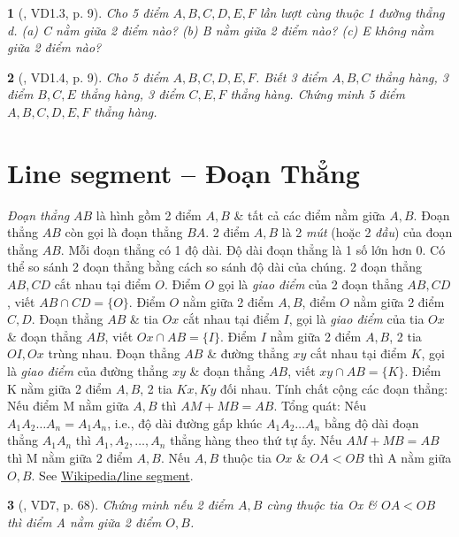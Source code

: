 \documentclass{article}
\newtheorem{baitoan}{}
\begin{document}
\begin{baitoan}[\cite{TLCT_THCS_Toan_6_hinh_hoc}, VD1.3, p. 9]
	Cho 5 điểm $A,B,C,D,E,F$ lần lượt cùng thuộc 1 đường thẳng d. (a) C nằm giữa 2 điểm nào? (b) B nằm giữa 2 điểm nào? (c) E không nằm giữa 2 điểm nào?
\end{baitoan}

\begin{baitoan}[\cite{TLCT_THCS_Toan_6_hinh_hoc}, VD1.4, p. 9]
	Cho 5 điểm $A,B,C,D,E,F$. Biết 3 điểm $A,B,C$ thẳng hàng, 3 điểm $B,C,E$ thẳng hàng, 3 điểm $C,E,F$ thẳng hàng. Chứng minh 5 điểm $A,B,C,D,E,F$ thẳng hàng.
\end{baitoan}


\section{Line segment -- Đoạn Thẳng}
 \textit{Đoạn thẳng} $AB$ là hình gồm 2 điểm $A,B$ \& tất cả các điểm nằm giữa $A,B$. Đoạn thẳng $AB$ còn gọi là đoạn thẳng $BA$. 2 điểm $A,B$ là 2 \textit{mút} (hoặc 2 \textit{đầu}) của đoạn thẳng $AB$. Mỗi đoạn thẳng có 1 độ dài. Độ dài đoạn thẳng là 1 số lớn hơn $0$.  Có thể so sánh 2 đoạn thẳng bằng cách so sánh độ dài của chúng.  2 đoạn thẳng $AB,CD$ cắt nhau tại điểm $O$. Điểm $O$ gọi là \textit{giao điểm} của 2 đoạn thẳng $AB,CD$, viết $AB\cap CD = \{O\}$. Điểm $O$ nằm giữa 2 điểm $A,B$, điểm $O$ nằm giữa 2 điểm $C,D$.  Đoạn thẳng $AB$ \& tia $Ox$ cắt nhau tại điểm $I$, gọi là \textit{giao điểm} của tia $Ox$ \& đoạn thẳng $AB$, viết $Ox\cap AB = \{I\}$. Điểm $I$ nằm giữa 2 điểm $A,B$, 2 tia $OI,Ox$ trùng nhau.  Đoạn thẳng $AB$ \& đường thẳng $xy$ cắt nhau tại điểm $K$, gọi là \textit{giao điểm} của đường thẳng $xy$ \& đoạn thẳng $AB$, viết $xy\cap AB = \{K\}$. Điểm K nằm giữa 2 điểm $A,B$, 2 tia $Kx,Ky$ đối nhau.  {\sf Tính chất cộng các đoạn thẳng}: Nếu điểm M nằm giữa $A,B$ thì $AM + MB = AB$. Tổng quát: Nếu $A_1A_2\ldots A_n = A_1A_n$, i.e., độ dài đường gấp khúc $A_1A_2\ldots A_n$ bằng độ dài đoạn thẳng $A_1A_n$ thì $A_1,A_2,\ldots,A_n$ thẳng hàng theo thứ tự ấy. Nếu $AM + MB = AB$ thì M nằm giữa 2 điểm $A,B$. Nếu $A,B$ thuộc tia $Ox$ \& $OA < OB$ thì A nằm giữa $O,B$. See \href{https://en.wikipedia.org/wiki/Line_segment}{Wikipedia{\tt/}line segment}.

\begin{baitoan}[\cite{Binh_Toan_6_tap_2}, VD7, p. 68]
	Chứng minh nếu 2 điểm $A,B$ cùng thuộc tia Ox \& $OA < OB$ thì điểm A nằm giữa 2 điểm $O,B$.
\end{baitoan}
\end{document}
